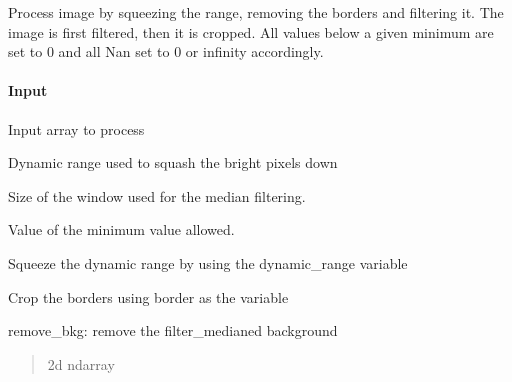 \documentclass[letterpaper,10pt,english]{sphinxmanual}
\begin{document}
\begin{fulllineitems}
\label{\detokenize{api/pymusepipe:pymusepipe.util_image.flatclean_image}}
\pysigstartsignatures
{}
\pysigstopsignatures
\sphinxAtStartPar
Process image by squeezing the range, removing
the borders and filtering it. The image is first filtered,
then it is cropped. All values below a given minimum are
set to 0 and all Nan set to 0 or infinity accordingly.


\paragraph{Input}
\label{\detokenize{api/pymusepipe:id145}}\begin{description}
\sphinxAtStartPar
Input array to process

\sphinxAtStartPar
Dynamic range used to squash the bright pixels down

\sphinxAtStartPar
Size of the window used for the median filtering.

\sphinxAtStartPar
Value of the minimum value allowed.

\sphinxAtStartPar
Squeeze the dynamic range by using the dynamic\_range variable

\sphinxAtStartPar
Crop the borders using border as the variable

\end{description}

\sphinxAtStartPar
remove\_bkg: remove the filter\_medianed background
\begin{quote}\begin{description}
\sphinxAtStartPar
{}

\sphinxAtStartPar
2d ndarray

\end{description}\end{quote}

\end{fulllineitems}
\end{document}
